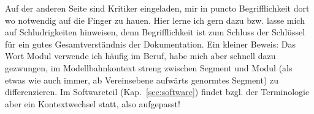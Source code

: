 Auf der anderen Seite sind Kritiker eingeladen, mir in puncto Begrifflichkeit dort wo notwendig auf die Finger zu hauen.
Hier lerne ich gern dazu bzw. lasse mich auf Schludrigkeiten hinweisen, denn Begrifflichkeit ist zum Schluss der Schl\"ussel f\"ur ein gutes Gesamtverst\"andnis der Dokumentation.
Ein kleiner Beweis:
Das Wort Modul verwende ich h\"aufig im Beruf, habe mich aber schnell dazu gezwungen, im Modellbahnkontext streng zwischen Segment und Modul (als etwas wie auch immer, ab Vereinsebene aufw\"arts genormtes Segment) zu differenzieren.
Im Softwareteil (Kap.~\ref{sec:software}) findet bzgl. der Terminologie aber ein Kontextwechsel statt, also aufgepasst!